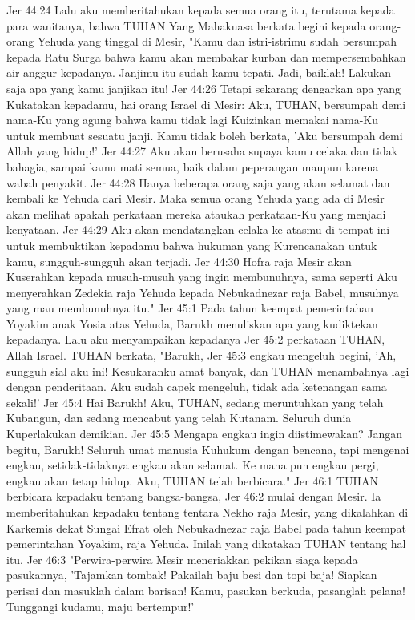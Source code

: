Jer 44:24  Lalu aku memberitahukan kepada semua orang itu, terutama kepada para wanitanya, bahwa TUHAN Yang Mahakuasa berkata begini kepada orang-orang Yehuda yang tinggal di Mesir, "Kamu dan istri-istrimu sudah bersumpah kepada Ratu Surga bahwa kamu akan membakar kurban dan mempersembahkan air anggur kepadanya. Janjimu itu sudah kamu tepati. Jadi, baiklah! Lakukan saja apa yang kamu janjikan itu!
Jer 44:26  Tetapi sekarang dengarkan apa yang Kukatakan kepadamu, hai orang Israel di Mesir: Aku, TUHAN, bersumpah demi nama-Ku yang agung bahwa kamu tidak lagi Kuizinkan memakai nama-Ku untuk membuat sesuatu janji. Kamu tidak boleh berkata, 'Aku bersumpah demi Allah yang hidup!'
Jer 44:27  Aku akan berusaha supaya kamu celaka dan tidak bahagia, sampai kamu mati semua, baik dalam peperangan maupun karena wabah penyakit.
Jer 44:28  Hanya beberapa orang saja yang akan selamat dan kembali ke Yehuda dari Mesir. Maka semua orang Yehuda yang ada di Mesir akan melihat apakah perkataan mereka ataukah perkataan-Ku yang menjadi kenyataan.
Jer 44:29  Aku akan mendatangkan celaka ke atasmu di tempat ini untuk membuktikan kepadamu bahwa hukuman yang Kurencanakan untuk kamu, sungguh-sungguh akan terjadi.
Jer 44:30  Hofra raja Mesir akan Kuserahkan kepada musuh-musuh yang ingin membunuhnya, sama seperti Aku menyerahkan Zedekia raja Yehuda kepada Nebukadnezar raja Babel, musuhnya yang mau membunuhnya itu."
Jer 45:1  Pada tahun keempat pemerintahan Yoyakim anak Yosia atas Yehuda, Barukh menuliskan apa yang kudiktekan kepadanya. Lalu aku menyampaikan kepadanya
Jer 45:2  perkataan TUHAN, Allah Israel. TUHAN berkata, "Barukh,
Jer 45:3  engkau mengeluh begini, 'Ah, sungguh sial aku ini! Kesukaranku amat banyak, dan TUHAN menambahnya lagi dengan penderitaan. Aku sudah capek mengeluh, tidak ada ketenangan sama sekali!'
Jer 45:4  Hai Barukh! Aku, TUHAN, sedang meruntuhkan yang telah Kubangun, dan sedang mencabut yang telah Kutanam. Seluruh dunia Kuperlakukan demikian.
Jer 45:5  Mengapa engkau ingin diistimewakan? Jangan begitu, Barukh! Seluruh umat manusia Kuhukum dengan bencana, tapi mengenai engkau, setidak-tidaknya engkau akan selamat. Ke mana pun engkau pergi, engkau akan tetap hidup. Aku, TUHAN telah berbicara."
Jer 46:1  TUHAN berbicara kepadaku tentang bangsa-bangsa,
Jer 46:2  mulai dengan Mesir. Ia memberitahukan kepadaku tentang tentara Nekho raja Mesir, yang dikalahkan di Karkemis dekat Sungai Efrat oleh Nebukadnezar raja Babel pada tahun keempat pemerintahan Yoyakim, raja Yehuda. Inilah yang dikatakan TUHAN tentang hal itu,
Jer 46:3  "Perwira-perwira Mesir meneriakkan pekikan siaga kepada pasukannya, 'Tajamkan tombak! Pakailah baju besi dan topi baja! Siapkan perisai dan masuklah dalam barisan! Kamu, pasukan berkuda, pasanglah pelana! Tunggangi kudamu, maju bertempur!'
